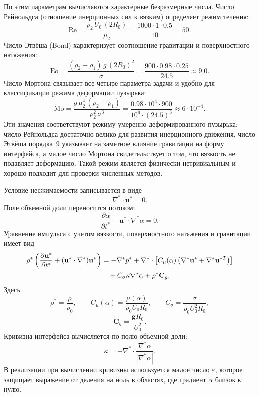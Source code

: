 \documentclass[12pt,a4paper]{article}
\newcommand{\Rbase}{R_0}
\newcommand{\Uref}{U_0}
\newcommand{\rhoref}{\rho_0}
\begin{document}
По этим параметрам вычисляются характерные безразмерные числа. Число Рейнольдса
(отношение инерционных сил к вязким) определяет режим течения:
\begin{equation}
    \mathrm{Re} = \frac{\rho_2\,U_0\,(2R_0)}{\mu_2}
    = \frac{1000\cdot 1\cdot 0.5}{10} = 50.
\end{equation}
Число Этвёша (Bond) характеризует соотношение гравитации и поверхностного
натяжения:
\begin{equation}
    \mathrm{Eo} = \frac{(\rho_2-\rho_1)\,g\,(2R_0)^2}{\sigma}
    = \frac{900\cdot 0.98\cdot 0.25}{24.5} \approx 9.0.
\end{equation}
Число Мортона связывает все четыре параметра задачи и удобно для классификации
режима деформации пузырька:
\begin{equation}
    \mathrm{Mo} = \frac{g\,\mu_2^4\,(\rho_2-\rho_1)}{\rho_2^2\,\sigma^3}
    = \frac{0.98\cdot 10^4\cdot 900}{10^6\cdot (24.5)^3} \approx 6\cdot 10^{-4}.
\end{equation}
Эти значения соответствуют режиму умеренно деформированного пузырька:
число Рейнольдса достаточно велико для развития инерционного движения, число
Этвёша порядка~9 указывает на заметное влияние гравитации на форму
интерфейса, а малое число Мортона свидетельствует о том, что вязкость не
подавляет деформацию. Такой режим является физически нетривиальным и хорошо
подходит для проверки численных методов.

Условие несжимаемости записывается в виде
\begin{equation}
    \nabla^*\cdot\mathbf{u}^*=0.
    \label{eq:chapter2_mass}
\end{equation}
Поле объемной доли переносится потоком:
\begin{equation}
    \frac{\partial\alpha}{\partial t^*}
    +\mathbf{u}^*\cdot\nabla^*\alpha=0.
    \label{eq:chapter2_alpha_transport}
\end{equation}
Уравнение импульса с учетом вязкости, поверхностного натяжения и гравитации
имеет вид
\begin{align}
    \rho^*
    \left(
        \frac{\partial\mathbf{u}^*}{\partial t^*}
        +(\mathbf{u}^*\cdot\nabla^*)\mathbf{u}^*
    \right)
    &=
    -\nabla^*p^*
    +\nabla^*\cdot
    \left[
        C_\mu(\alpha)
        \left(\nabla^*\mathbf{u}^*+\nabla^*\mathbf{u}^{*T}\right)
    \right]
    \notag\\
    &\quad
    +C_\sigma\kappa\nabla^*\alpha
    +\rho^*\mathbf{C}_g.
    \label{eq:chapter2_momentum}
\end{align}
Здесь
\[
    \rho^*=\frac{\rho}{\rhoref},
    \qquad
    C_\mu(\alpha)=\frac{\mu(\alpha)}{\rhoref\Uref\Rbase},
    \qquad
    C_\sigma=\frac{\sigma}{\rhoref\Uref^2\Rbase},
\]
\[
    \mathbf{C}_g=\frac{\mathbf{g}\Rbase}{\Uref^2}.
\]
Кривизна интерфейса вычисляется по полю объемной доли:
\begin{equation}
    \kappa
    =
    -\nabla^*\cdot
    \frac{\nabla^*\alpha}{|\nabla^*\alpha|}.
    \label{eq:chapter2_curvature}
\end{equation}
В реализации при вычислении кривизны используется малое число
\(\varepsilon\), которое защищает выражение от деления на ноль в областях, где
градиент \(\alpha\) близок к нулю.
\end{document}
